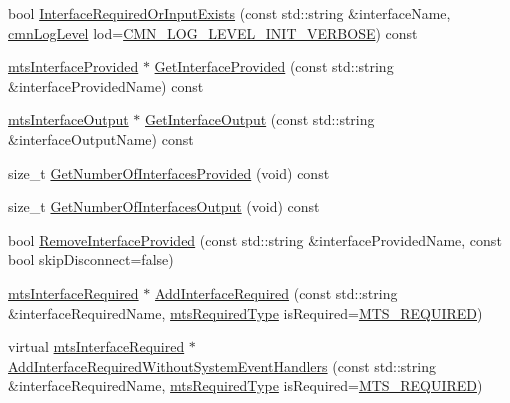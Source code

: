 \begin{DoxyCompactItemize}
\item 
bool \hyperlink{classmts_component_a02d443909ac1735fde4adaad6cec21e0}{Interface\-Required\-Or\-Input\-Exists} (const std\-::string \&interface\-Name, \hyperlink{cmn_log_lo_d_8h_a70c67165c37a0971e0dd1a85d4edaaae}{cmn\-Log\-Level} lod=\hyperlink{cmn_log_lo_d_8h_ae0fcf22a2f3faaba0c5bf49a237e3f3e}{C\-M\-N\-\_\-\-L\-O\-G\-\_\-\-L\-E\-V\-E\-L\-\_\-\-I\-N\-I\-T\-\_\-\-V\-E\-R\-B\-O\-S\-E}) const 
\item 
\hyperlink{classmts_interface_provided}{mts\-Interface\-Provided} $\ast$ \hyperlink{classmts_component_aa3c86939242f85aba59e575993b3da36}{Get\-Interface\-Provided} (const std\-::string \&interface\-Provided\-Name) const 
\item 
\hyperlink{classmts_interface_output}{mts\-Interface\-Output} $\ast$ \hyperlink{classmts_component_ac34838dee3cbb399f6ded4059e21379c}{Get\-Interface\-Output} (const std\-::string \&interface\-Output\-Name) const 
\item 
size\-\_\-t \hyperlink{classmts_component_a63d048b67ce121c3877c3cd9500bb942}{Get\-Number\-Of\-Interfaces\-Provided} (void) const 
\item 
size\-\_\-t \hyperlink{classmts_component_a8303167749c3c69741df473fe18e6e65}{Get\-Number\-Of\-Interfaces\-Output} (void) const 
\item 
bool \hyperlink{classmts_component_a27330dca8456e4bcdbd33fa0189f5202}{Remove\-Interface\-Provided} (const std\-::string \&interface\-Provided\-Name, const bool skip\-Disconnect=false)
\item 
\hyperlink{classmts_interface_required}{mts\-Interface\-Required} $\ast$ \hyperlink{classmts_component_a9521c839440799846e90fb9756295ae5}{Add\-Interface\-Required} (const std\-::string \&interface\-Required\-Name, \hyperlink{mts_forward_declarations_8h_a9ef1ce54724afde7802db326ff8606f3}{mts\-Required\-Type} is\-Required=\hyperlink{mts_forward_declarations_8h_a9ef1ce54724afde7802db326ff8606f3ae01fd85391b60e546bbb1be9716c4ec9}{M\-T\-S\-\_\-\-R\-E\-Q\-U\-I\-R\-E\-D})
\item 
virtual \hyperlink{classmts_interface_required}{mts\-Interface\-Required} $\ast$ \hyperlink{classmts_component_a007fa609ad6324d5cce07f125fd4fb5a}{Add\-Interface\-Required\-Without\-System\-Event\-Handlers} (const std\-::string \&interface\-Required\-Name, \hyperlink{mts_forward_declarations_8h_a9ef1ce54724afde7802db326ff8606f3}{mts\-Required\-Type} is\-Required=\hyperlink{mts_forward_declarations_8h_a9ef1ce54724afde7802db326ff8606f3ae01fd85391b60e546bbb1be9716c4ec9}{M\-T\-S\-\_\-\-R\-E\-Q\-U\-I\-R\-E\-D})

\end{DoxyCompactItemize}
